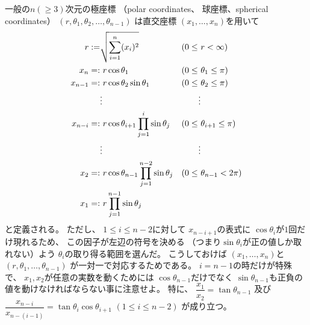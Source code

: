 一般の$n (\ge 3)$次元の極座標
（polar coordinates、
球座標、spherical coordinates）
$(r, \theta_1, \theta_2,
\dots, \theta_{n-1})$
は直交座標
$(x_1, \dots, x_n)$を用いて
\begin{subequations}
\begin{align}
    r :=& \sqrt{
        \sum_{i=1}^n
        (x_i)^2
    }
&
    (0 \le\ &r < \infty)
\\
    x_n
    =:&\ 
    r \cos \theta_1
&
    (0 \le\ &\theta_1 \le \pi)
\\
    x_{n-1}
    =:&\ 
    r \cos \theta_2
    \sin \theta_1
&
    (0 \le\ &\theta_2 \le \pi)
\\\notag
    &
    \vdots
    &
    \vdots
\\
    x_{n-i}
    =:&\ 
    r
    \cos \theta_{i+1}
    \prod_{j=1}^{i}
    \sin \theta_j
&
    (0 \le\ &\theta_{i+1} \le \pi)
\\\notag
    &
    \vdots
    &
    \vdots
\\
    x_{2}
    =:&\ 
    r
    \cos \theta_{n-1}
    \prod_{j=1}^{n-2}
    \sin \theta_j
&
    (0 \le\ &\theta_{n-1} < 2 \pi)
\\
    x_{1}
    =:&\ 
    r
    \prod_{j=1}^{n-1}
    \sin \theta_j
\end{align}
\label{n dimensional spherical coordinates}
\end{subequations}
と定義される。
ただし、
$1 \le i \le n-2$に対して
$x_{n-i+1}$の表式に
$\cos \theta_i$が$1$回だけ現れるため、
この因子が左辺の符号を決める
（つまり$\sin \theta_i$が正の値しか取れない）よう
$\theta_i$の取り得る範囲を選んだ。
こうしておけば
$(x_1, \dots, x_n)$と
$(r, \theta_1, \dots, \theta_{n-1})$
が一対一で対応するためである。
$i = n - 1$の時だけが特殊で、
$x_1, x_2$が任意の実数を動くためには
$\cos \theta_{n-1}$だけでなく
$\sin \theta_{n-1}$も正負の値を動けなければならない事に注意せよ。
特に、
$\dfrac
    { x_{1} }
    { x_{2} }
=
    \tan \theta_{n-1}
$
及び
$
\dfrac
    { x_{n - i} }
    { x_{n - (i - 1)} }
=
    \tan \theta_{i}
    \cos \theta_{i+1}
$
$(1 \le i \le n - 2)$
が成り立つ。

